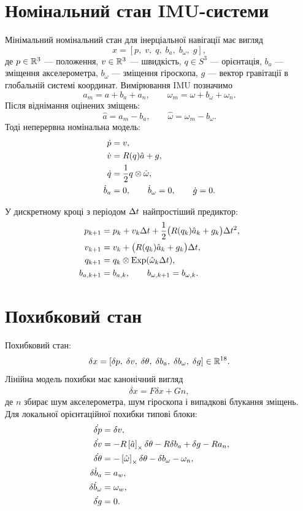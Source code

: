 \section{Номінальний стан IMU-системи}

Мінімальний номінальний стан для інерціальної навігації має вигляд
\[
x =
\left[
p,\; v,\; q,\; b_a,\; b_\omega,\; g
\right],
\]
де $p\in\mathbb{R}^3$ --- положення, $v\in\mathbb{R}^3$ --- швидкість, $q\in S^3$ --- орієнтація, $b_a$ --- зміщення акселерометра, $b_\omega$ --- зміщення гіроскопа, $g$ --- вектор гравітації в глобальній системі координат. Вимірювання IMU позначимо
\[
a_m = a + b_a + a_n,\qquad
\omega_m = \omega + b_\omega + \omega_n.
\]
Після віднімання оцінених зміщень:
\[
\hat a = a_m - b_a,\qquad
\hat\omega = \omega_m - b_\omega.
\]
Тоді неперервна номінальна модель:
\begin{align}
\dot p &= v,\\
\dot v &= R(q)\hat a + g,\\
\dot q &= \frac12 q\otimes \hat\omega,\\
\dot b_a &= 0,\qquad \dot b_\omega = 0,\qquad \dot g = 0.
\end{align}

У дискретному кроці з періодом $\Delta t$ найпростіший предиктор:
\begin{align}
p_{k+1} &= p_k + v_k\Delta t + \frac12\big(R(q_k)\hat a_k+g_k\big)\Delta t^2,\\
v_{k+1} &= v_k + \big(R(q_k)\hat a_k+g_k\big)\Delta t,\\
q_{k+1} &= q_k\otimes \operatorname{Exp}(\hat\omega_k\Delta t),\\
b_{a,k+1} &= b_{a,k},\qquad b_{\omega,k+1}=b_{\omega,k}.
\end{align}

\section{Похибковий стан}

Похибковий стан:
\[
\delta x =
\left[
\delta p,\; \delta v,\; \delta\theta,\; \delta b_a,\; \delta b_\omega,\; \delta g
\right]\in\mathbb{R}^{18}.
\]
Лінійна модель похибки має канонічний вигляд
\[
\dot{\delta x}=F\delta x+G n,
\]
де $n$ збирає шум акселерометра, шум гіроскопа і випадкові блукання зміщень. Для локальної орієнтаційної похибки типові блоки:
\begin{align}
\dot{\delta p} &= \delta v,\\
\dot{\delta v} &= -R\left[\hat a\right]_{\times}\delta\theta - R\delta b_a + \delta g - R a_n,\\
\dot{\delta\theta} &= -\left[\hat\omega\right]_{\times}\delta\theta - \delta b_\omega - \omega_n,\\
\dot{\delta b_a} &= a_w,\\
\dot{\delta b_\omega} &= \omega_w,\\
\dot{\delta g} &= 0.
\end{align}

